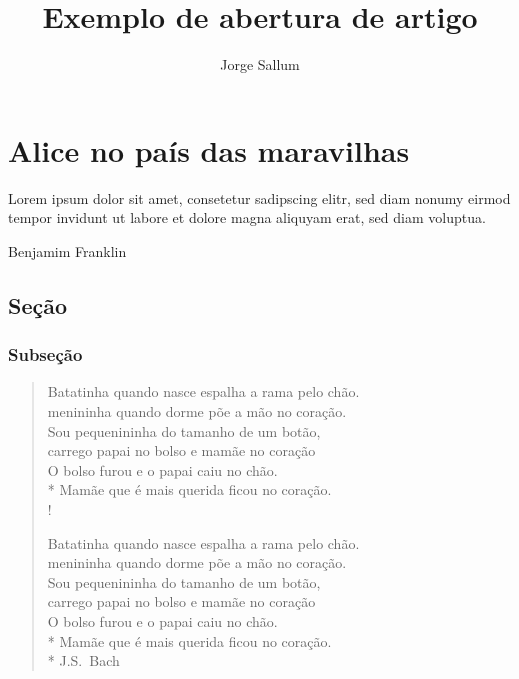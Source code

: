 \documentclass{memoir}
\title{Exemplo de abertura de artigo}
\author{Jorge Sallum}
\begin{document}
 

\maketitle
 

\setcounter{secnumdepth}{4} 
\tableofcontents


\chapter[Alice no país...]{Alice no país das maravilhas}

\epigraph{Lorem ipsum dolor sit amet, consetetur sadipscing elitr, sed diam nonumy eirmod tempor invidunt ut labore et dolore magna aliquyam erat, sed diam voluptua.}{Benjamim Franklin}

\section{Seção}
\lipsum[1]

\subsection{Subseção}

\begin{verse}
Batatinha quando nasce espalha a rama pelo chão.\\
menininha quando dorme põe a mão no coração.\\
Sou pequenininha do tamanho de um botão,\\
carrego papai no bolso e mamãe no coração\\
O bolso furou e o papai caiu no chão.\\*
Mamãe que é mais querida ficou no coração.\\!

Batatinha quando nasce espalha a rama pelo chão.\\
menininha quando dorme põe a mão no coração.\\
Sou pequenininha do tamanho de um botão,\\
carrego papai no bolso e mamãe no coração\\
O bolso furou e o papai caiu no chão.\\*
Mamãe que é mais querida ficou no coração.\\*
\nobreak\medskip
\hfill J.S.~Bach

\end{verse}
\lipsum[2]
\end{document}
